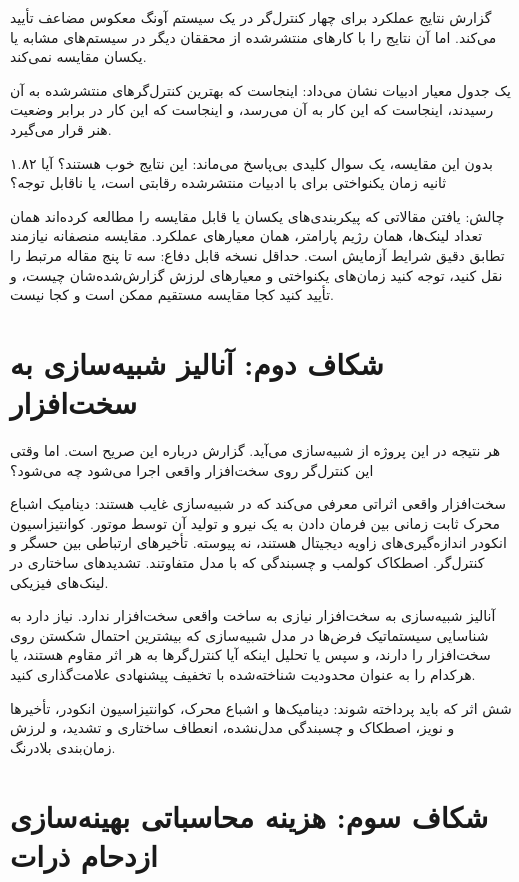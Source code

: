 \documentclass[12pt, a4paper]{article}
\newcommand{\dash}{\lr{---}}
\begin{document}
گزارش نتايج عملکرد برای چهار کنترل‌گر در يک سيستم آونگ معکوس مضاعف تأييد می‌کند. اما آن نتايج را با کارهای منتشرشده از محققان ديگر در سيستم‌های مشابه يا يکسان مقايسه نمی‌کند.

يک جدول معيار ادبيات نشان می‌داد: اينجاست که بهترين کنترل‌گرهای منتشرشده به آن رسيدند، اينجاست که اين کار به آن می‌رسد، و اينجاست که اين کار در برابر وضعيت هنر قرار می‌گيرد.

بدون اين مقايسه، يک سوال کليدی بی‌پاسخ می‌ماند: اين نتايج خوب هستند؟ آيا ۱.۸۲ ثانيه زمان يکنواختی برای  با ادبيات منتشرشده رقابتی است، يا ناقابل توجه؟

چالش: يافتن مقالاتی که پيکربندی‌های  يکسان يا قابل مقايسه را مطالعه کرده‌اند \dash{} همان تعداد لينک‌ها، همان رژيم پارامتر، همان معيارهای عملکرد. مقايسه منصفانه نيازمند تطابق دقيق شرايط آزمايش است. حداقل نسخه قابل دفاع: سه تا پنج مقاله مرتبط را نقل کنيد، توجه کنيد زمان‌های يکنواختی و معيارهای لرزش گزارش‌شده‌شان چيست، و تأييد کنيد کجا مقايسه مستقيم ممکن است و کجا نيست.

\section{شکاف دوم: آناليز شبيه‌سازی به سخت‌افزار}

هر نتيجه در اين پروژه از شبيه‌سازی می‌آيد. گزارش درباره اين صريح است. اما وقتی اين کنترل‌گر روی سخت‌افزار واقعی اجرا می‌شود چه می‌شود؟

سخت‌افزار واقعی اثراتی معرفی می‌کند که در شبيه‌سازی غايب هستند: ديناميک اشباع محرک \dash{} ثابت زمانی بين فرمان دادن به يک نيرو و توليد آن توسط موتور. کوانتيزاسيون انکودر \dash{} اندازه‌گيری‌های زاويه ديجيتال هستند، نه پيوسته. تأخيرهای ارتباطی بين حسگر و کنترل‌گر. اصطکاک کولمب و چسبندگی که با مدل متفاوتند. تشديدهای ساختاری در لينک‌های فيزيکی.

آناليز شبيه‌سازی به سخت‌افزار نيازی به ساخت واقعی سخت‌افزار ندارد. نياز دارد به شناسايی سيستماتيک فرض‌ها در مدل شبيه‌سازی که بيشترين احتمال شکستن روی سخت‌افزار را دارند، و سپس يا تحليل اينکه آيا کنترل‌گرها به هر اثر مقاوم هستند، يا هرکدام را به عنوان محدوديت شناخته‌شده با تخفيف پيشنهادی علامت‌گذاری کنيد.

شش اثر که بايد پرداخته شوند: ديناميک‌ها و اشباع محرک، کوانتيزاسيون انکودر، تأخيرها و نويز، اصطکاک و چسبندگی مدل‌نشده، انعطاف ساختاری و تشديد، و لرزش زمان‌بندی بلادرنگ.

\section{شکاف سوم: هزينه محاسباتی بهينه‌سازی ازدحام ذرات}
\end{document}
